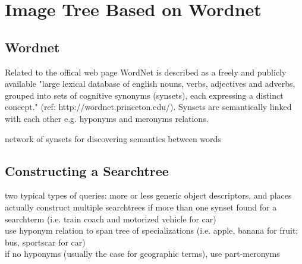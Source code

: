 %
\section{Image Tree Based on Wordnet}
\label{sec_wordnetsearchtree}

\subsection{Wordnet}
Related to the offical web page WordNet is described as a freely and publicly available "large lexical database of english nouns, verbs, adjectives and adverbs, grouped into sets of cognitive synonyms (synsets), each expressing a distinct concept." (ref: http://wordnet.princeton.edu/). Synsets are semantically linked with each other e.g. hyponyms and meronyms relations. 

network of synsets for discovering semantics between words \\
  

\subsection{Constructing a Searchtree}
two typical types of queries: more or less generic object descriptors, and places \\
actually construct multiple searchtrees if more than one synset found for a searchterm (i.e. train coach and motorized vehicle for car)\\
use hyponym relation to span tree of specializations (i.e. apple, banana for fruit; bus, sportscar for car)\\
if no hyponyms (usually the case for geographic terms), use part-meronyms\\

